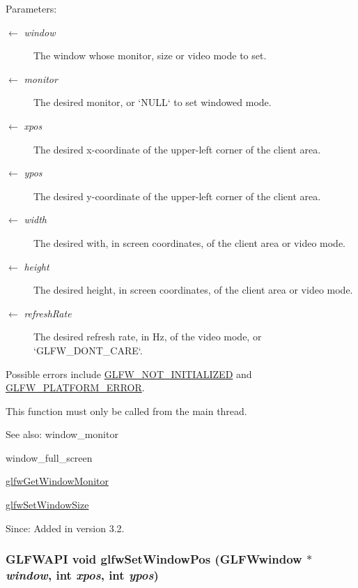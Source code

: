 \begin{Desc}
\item[Parameters:]
\begin{description}
\item[\mbox{$\leftarrow$} {\em window}]The window whose monitor, size or video mode to set. \item[\mbox{$\leftarrow$} {\em monitor}]The desired monitor, or `NULL` to set windowed mode. \item[\mbox{$\leftarrow$} {\em xpos}]The desired x-coordinate of the upper-left corner of the client area. \item[\mbox{$\leftarrow$} {\em ypos}]The desired y-coordinate of the upper-left corner of the client area. \item[\mbox{$\leftarrow$} {\em width}]The desired with, in screen coordinates, of the client area or video mode. \item[\mbox{$\leftarrow$} {\em height}]The desired height, in screen coordinates, of the client area or video mode. \item[\mbox{$\leftarrow$} {\em refreshRate}]The desired refresh rate, in Hz, of the video mode, or `GLFW\_\-DONT\_\-CARE`.\end{description}
\end{Desc}
Possible errors include \hyperlink{group__errors_g2374ee02c177f12e1fa76ff3ed15e14a}{GLFW\_\-NOT\_\-INITIALIZED} and \hyperlink{group__errors_gd44162d78100ea5e87cdd38426b8c7a1}{GLFW\_\-PLATFORM\_\-ERROR}.

This function must only be called from the main thread.

\begin{Desc}
\item[See also:]window\_\-monitor 

window\_\-full\_\-screen 

\hyperlink{group__window_gf1525cb3bccd5789c702cc9676ef3403}{glfwGetWindowMonitor} 

\hyperlink{group__window_ge54d1f4915ded15e267ddd3f41496cd2}{glfwSetWindowSize}\end{Desc}
\begin{Desc}
\item[Since:]Added in version 3.2. \end{Desc}
\hypertarget{group__window_g0dc8d880a0d87be16d3ea8114561f6f0}{
\subsubsection[glfwSetWindowPos]{\setlength{\rightskip}{0pt plus 5cm}GLFWAPI void glfwSetWindowPos ({\bf GLFWwindow} $\ast$ {\em window}, \/  int {\em xpos}, \/  int {\em ypos})}}
\label{group__window_g0dc8d880a0d87be16d3ea8114561f6f0}


